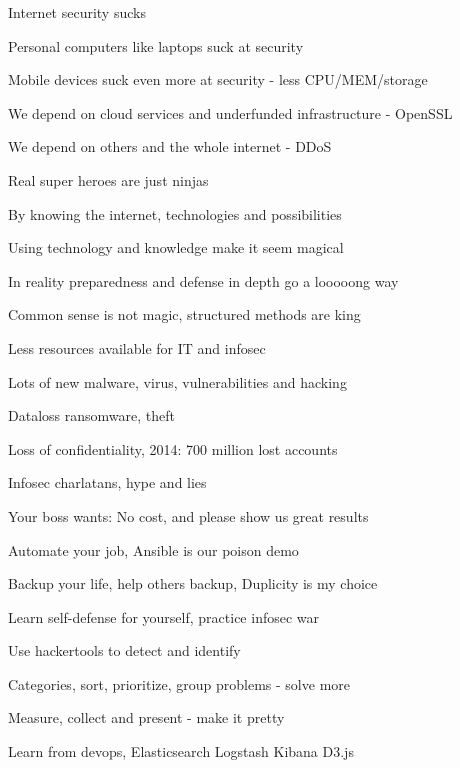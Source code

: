 \documentclass[20pt,landscape,a4paper,footrule]{foils}
\begin{document}

\begin{list1}
\item Internet security sucks
\item Personal computers like laptops suck at security
\item Mobile devices suck even more at security - less CPU/MEM/storage
\item We depend on cloud services and underfunded infrastructure - OpenSSL
\item We depend on others and the whole internet - DDoS
\end{list1}



\begin{list1}
\item Real super heroes are just ninjas
\item By knowing the internet, technologies and possibilities
\item Using technology and knowledge make it seem magical
\item In reality preparedness and defense in depth go a looooong way
\item Common sense is not magic, structured methods are king
\end{list1}


\begin{list1}
\item Less resources available for IT and infosec
\item Lots of new malware, virus, vulnerabilities and hacking
\item Dataloss ransomware, theft
\item Loss of confidentiality, 2014: 700 million lost accounts
\item Infosec charlatans, hype and lies
\end{list1}

\vskip 2cm
\centerline{Your boss wants: No cost, and please show us great results}


\begin{list1}
\item Automate your job, Ansible is our poison demo
\item Backup your life, help others backup, Duplicity is my choice
\item {} Learn self-defense for yourself, practice infosec war
\item Use hackertools to detect and identify
\item Categories, sort, prioritize, group problems - solve more
\item Measure, collect and present - make it pretty
\item Learn from devops, Elasticsearch Logstash Kibana D3.js
\end{list1}
\end{document}
